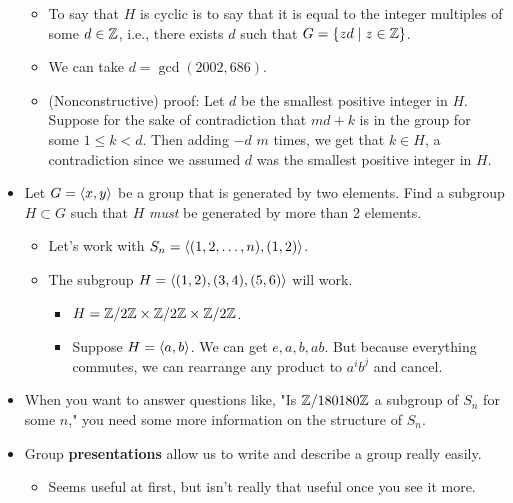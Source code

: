 \documentclass[../notes.tex]{subfiles}
\begin{document}
\begin{itemize}
\begin{itemize}
        \item To say that $H$ is cyclic is to say that it is equal to the integer multiples of some $d\in\mathbb{Z}$, i.e., there exists $d$ such that $G=\{zd\mid z\in\mathbb{Z}\}$.
        \item We can take $d=\gcd(2002,686)$.
        \item (Nonconstructive) proof: Let $d$ be the smallest positive integer in $H$. Suppose for the sake of contradiction that $md+k$ is in the group for some $1\leq k<d$. Then adding $-d$ $m$ times, we get that $k\in H$, a contradiction since we assumed $d$ was the smallest positive integer in $H$.
    \end{itemize}
    \item Let $G=\left\langle{x,y}\right\rangle$ be a group that is generated by two elements. Find a subgroup $H\subset G$ such that $H$ \emph{must} be generated by more than 2 elements.
    \begin{itemize}
        \item Let's work with $S_n=\left\langle{(1,2,\dots,n),(1,2)}\right\rangle$.
        \item The subgroup $H=\left\langle{(1,2),(3,4),(5,6)}\right\rangle$ will work.
        \begin{itemize}
            \item $H=\mathbb{Z}/2\mathbb{Z}\times\mathbb{Z}/2\mathbb{Z}\times\mathbb{Z}/2\mathbb{Z}$.
            \item Suppose $H=\left\langle{a,b}\right\rangle$. We can get $e,a,b,ab$. But because everything commutes, we can rearrange any product to $a^ib^j$ and cancel.
        \end{itemize}
    \end{itemize}
    \item When you want to answer questions like, "Is $\mathbb{Z}/180180\mathbb{Z}$ a subgroup of $S_n$ for some $n$," you need some more information on the structure of $S_n$.
    \item Group \textbf{presentations} allow us to write and describe a group really easily.
    \begin{itemize}
        \item Seems useful at first, but isn't really that useful once you see it more.
    \end{itemize}
\end{itemize}
\end{document}
